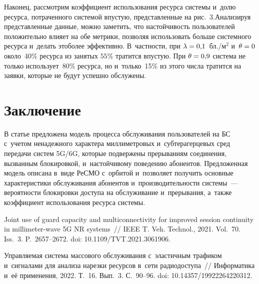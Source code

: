 \begin{multicols}{2}
{}


Наконец, рассмотрим коэффициент использования ресурса сис\-те\-мы и~долю ресурса, 
по\-тра\-чен\-но\-го сис\-те\-мой впус\-тую, пред\-став\-лен\-ные на рис.~3.\linebreak Анализируя 
пред\-став\-лен\-ные данные,  мож\-но заметить, что на\-стой\-чи\-вость пользователей 
положительно влияет на обе мет\-ри\-ки, поз\-во\-ляя использовать больше сис\-тем\-но\-го 
ресурса и~делать это\linebreak более эффективно. В~част\-ности, при $\lambda\hm=0{,}1$~бл./м$^2$ 
и~$\theta\hm=0$ около~40\% ресурса из занятых $55$\% тратится впустую. При 
$\theta\hm=0{,}9$ сис\-те\-ма не только использует~80\% ресурса, но и~только~15\% из 
этого чис\-ла тратится на заявки, которые не будут успеш\-но об\-слу\-жены. 





\section{Заключение}

В статье предложена модель процесса обслуживания пользователей на БС с~учетом 
не\-на\-деж\-но\-го характера мил\-ли\-мет\-ро\-вых и~субтерагерцевых сред передачи сис\-тем 
5G/6G, которые подвержены прерываниям со\-еди\-не\-ния, вызванным блокировкой, и~настойчивому поведению абонентов. Предложенная модель описана в~виде РеСМО 
с~орбитой и~поз\-во\-ля\-ет получить основные характеристики обслуживания абонентов 
и~про\-из\-во\-ди\-тель\-ности сис\-те\-мы~--- вероятности блокировки до\-сту\-па на обслуживание 
и~прерывания, а~так\-же коэффициент использования ресурса сис\-темы.
{

}




{\small\frenchspacing
 {\baselineskip=12pt
 \begin{thebibliography}{9}
 Joint use of guard 
capacity and multiconnectivity for improved session continuity in millimeter-wave 5G NR systems~// 
IEEE T. Veh. Technol., 2021. Vol.~70. 
Iss.~3. P.~2657--2672. doi: 10.1109/TVT.2021.3061906.

Управляемая сис\-те\-ма массового обслуживания с~элас\-тич\-ным трафиком и~сигналами для 
анализа нарезки ресурсов в~сети радиодоступа~// Информатика и~её применения, 
2022. Т.~16. Вып.~3. С.~90--96. doi: 10.14357/19922264220312.


\end{thebibliography}}}
\end{multicols}
